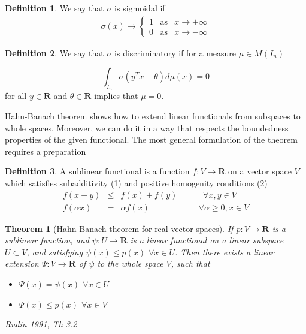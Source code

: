\documentclass[]{article}
\newtheorem{theorem}{Theorem}[section]
\theoremstyle{definition}
\newtheorem{definition}{Definition}[section]
\begin{document}
\begin{definition}
	We say that $\sigma$ is sigmoidal if
	\begin{eqnarray*}
		\sigma(x) \rightarrow \begin{cases} 1 \;\;\;\text{as} &x \rightarrow +\infty\\ 0 \;\;\;\text{as} &x \rightarrow -\infty\end{cases}
	\end{eqnarray*}
	
\end{definition}

\begin{definition}
We say that $\sigma$ is discriminatory if for a measure $\mu \in M(I_n)$ 

$$
\int_{I_n} \sigma \left( y^Tx + \theta \right) d\mu(x) = 0
$$
for all $y\in \mathbf{R}$ and $\theta \in \mathbf{R}$ implies that $\mu = 0$.
	
\end{definition}


Hahn-Banach theorem shows how to extend linear functionals from subspaces to whole spaces. Moreover, we can do it in a way that respects the boundedness
properties of the given functional. The most general formulation of the theorem requires a preparation

\begin{definition}
A sublinear functional is a function $f:V \rightarrow \mathbf{R}$ on a vector space $V$ which satisfies subadditivity (1) and positive homogenity conditions (2)
\begin{eqnarray}
f\left(x+y\right) &\leq& f\left(x\right) + f\left(y\right) \;\;\;\;\;\;\;\;\;\;\;\forall x,y  \in V \\
f\left(\alpha x\right) &=&\alpha f\left(x\right) \;\;\;\;\;\;\;\;\;\;\;\;\;\;\;\;\;\;\;\;\; \forall \alpha\geq 0, x \in V
\end{eqnarray}
\end{definition}

\begin{theorem}[Hahn-Banach theorem for real vector spaces]
	If $p : V \rightarrow \mathbf{R}$ is a sublinear function, and $\psi : U \rightarrow \mathbf{R}$ is a linear functional on a linear subspace $U \subset V$, and satisfying $\psi(x) \leq p(x)$ $\forall x \in U$.
	Then there exists a linear extension $\Psi:V \rightarrow \mathbf{R}$ of $\psi$ to the whole space $V$, such that
	
	\begin{itemize}
		\item $\Psi(x) = \psi(x)$ $\forall x \in U$
		\item $\Psi(x) \leq p(x)$ $\forall x \in V$
	\end{itemize}
	
	Rudin 1991, Th 3.2
	
\end{theorem}
\end{document}
